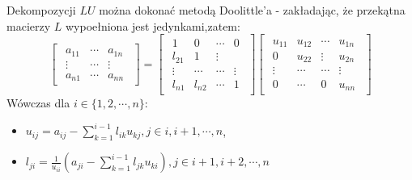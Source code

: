 \documentclass{article}
\begin{document}
\begin{enumerate}
    Dekompozycji $LU$ można dokonać metodą Doolittle'a - zakładając, że przekątna macierzy $L$ wypoełniona jest jedynkami,zatem:
    $$
        \begin{bmatrix}\begin{array}{rrr} a_{11} & \cdots & a_{1n}\\ \vdots & \cdots & \vdots \\ a_{n1} & \cdots & a_{nn} \end{array}\end{bmatrix}
        =
        \begin{bmatrix}\begin{array}{rrrr} 1 & 0 & \cdots & 0\\ l_{21} & 1 & \vdots \\ \vdots & \cdots & \cdots & \vdots \\ l_{n1} & l_{n2} & \cdots & 1 \end{array}\end{bmatrix}
        \begin{bmatrix}\begin{array}{rrrr} u_{11} & u_{12} & \cdots & u_{1n}\\ 0 & u_{22} & \vdots & u_{2n}\\ \vdots & \cdots & \cdots & \vdots \\ 0 & \cdots & 0 & u_{nn} \end{array}\end{bmatrix}
    $$
    Wówczas dla $i \in \{ 1, 2, \cdots, n \}$:
    \begin{itemize}
        \item $u_{ij} = a_{ij} - \sum_{k=1}^{i-1}{l_{ik}u_{kj}}, j\in {i, i+1, \cdots, n}$,
        \item $l_{ji} = \frac{1}{u_{ii}}(a_{ji} - \sum_{k=1}^{i-1}{l_{jk}u_{ki}}), j\in {i+1, i+2, \cdots, n}$
    \end{itemize}

\end{enumerate}
    
\end{document}
